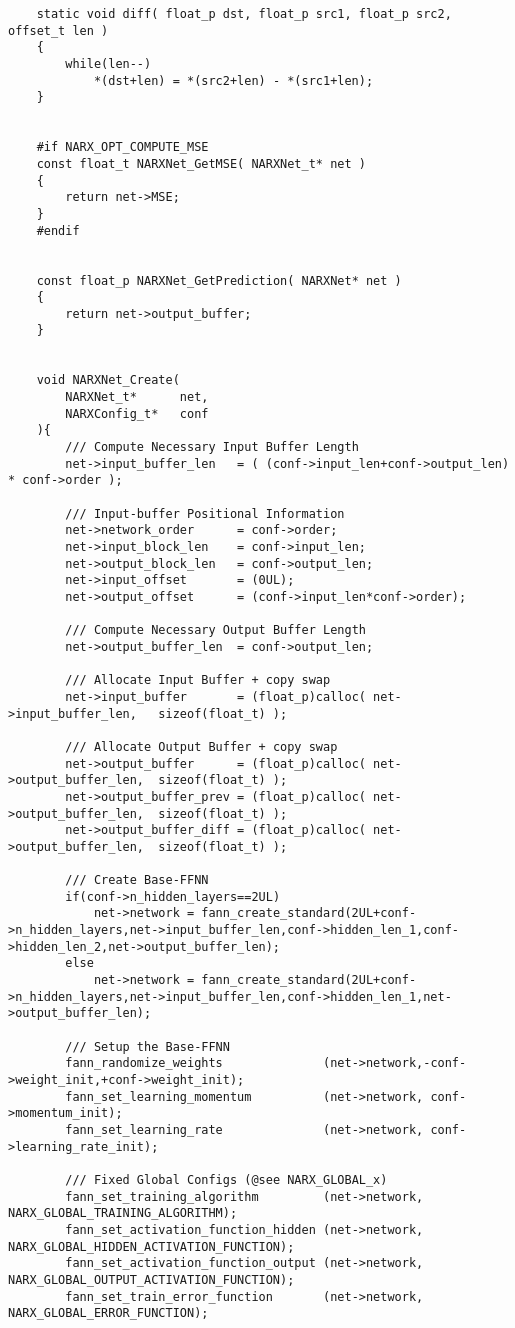 \begin{lstlisting}
	static void diff( float_p dst, float_p src1, float_p src2, offset_t len )
	{
		while(len--)
			*(dst+len) = *(src2+len) - *(src1+len);
	}


	#if NARX_OPT_COMPUTE_MSE
	const float_t NARXNet_GetMSE( NARXNet_t* net )
	{
		return net->MSE;
	}
	#endif


	const float_p NARXNet_GetPrediction( NARXNet* net )
	{
		return net->output_buffer;
	}


	void NARXNet_Create( 
		NARXNet_t*		net, 
		NARXConfig_t*	conf
	){
		/// Compute Necessary Input Buffer Length
		net->input_buffer_len	= ( (conf->input_len+conf->output_len) * conf->order );
		
		/// Input-buffer Positional Information
		net->network_order		= conf->order;
		net->input_block_len	= conf->input_len;
		net->output_block_len	= conf->output_len;
		net->input_offset		= (0UL);
		net->output_offset		= (conf->input_len*conf->order);

		/// Compute Necessary Output Buffer Length
		net->output_buffer_len	= conf->output_len;
		
		/// Allocate Input Buffer + copy swap
		net->input_buffer		= (float_p)calloc( net->input_buffer_len,	sizeof(float_t) );

		/// Allocate Output Buffer + copy swap
		net->output_buffer		= (float_p)calloc( net->output_buffer_len,	sizeof(float_t) );
		net->output_buffer_prev	= (float_p)calloc( net->output_buffer_len,	sizeof(float_t) );
		net->output_buffer_diff	= (float_p)calloc( net->output_buffer_len,	sizeof(float_t) );

		/// Create Base-FFNN
		if(conf->n_hidden_layers==2UL)
			net->network = fann_create_standard(2UL+conf->n_hidden_layers,net->input_buffer_len,conf->hidden_len_1,conf->hidden_len_2,net->output_buffer_len);
		else
			net->network = fann_create_standard(2UL+conf->n_hidden_layers,net->input_buffer_len,conf->hidden_len_1,net->output_buffer_len);
		
		/// Setup the Base-FFNN
		fann_randomize_weights				(net->network,-conf->weight_init,+conf->weight_init);
		fann_set_learning_momentum			(net->network, conf->momentum_init);
		fann_set_learning_rate				(net->network, conf->learning_rate_init);

		/// Fixed Global Configs (@see NARX_GLOBAL_x) 
		fann_set_training_algorithm			(net->network, NARX_GLOBAL_TRAINING_ALGORITHM);
		fann_set_activation_function_hidden	(net->network, NARX_GLOBAL_HIDDEN_ACTIVATION_FUNCTION);
		fann_set_activation_function_output	(net->network, NARX_GLOBAL_OUTPUT_ACTIVATION_FUNCTION);
		fann_set_train_error_function		(net->network, NARX_GLOBAL_ERROR_FUNCTION);


\end{lstlisting}
